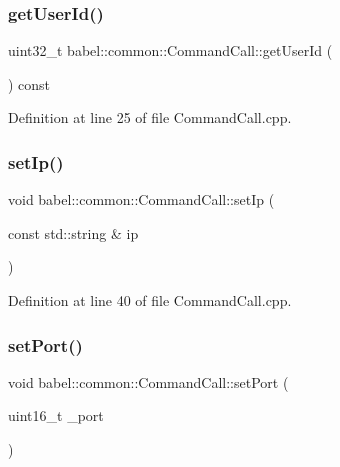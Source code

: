 \subsubsection{\texorpdfstring{get\+User\+Id()}{getUserId()}}
{\footnotesize\ttfamily uint32\+\_\+t babel\+::common\+::\+Command\+Call\+::get\+User\+Id (\begin{DoxyParamCaption}{ }\end{DoxyParamCaption}) const}



Definition at line 25 of file Command\+Call.\+cpp.

\mbox{\label{classbabel_1_1common_1_1_command_call_a58f28b212a295ab0626abc2067f352b9}} 
\subsubsection{\texorpdfstring{set\+Ip()}{setIp()}}
{\footnotesize\ttfamily void babel\+::common\+::\+Command\+Call\+::set\+Ip (\begin{DoxyParamCaption}\item[{const std\+::string \&}]{ip }\end{DoxyParamCaption})}



Definition at line 40 of file Command\+Call.\+cpp.

\mbox{\label{classbabel_1_1common_1_1_command_call_af8d2a768b5464d5da991cab4890b2b67}} 
\subsubsection{\texorpdfstring{set\+Port()}{setPort()}}
{\footnotesize\ttfamily void babel\+::common\+::\+Command\+Call\+::set\+Port (\begin{DoxyParamCaption}\item[{uint16\+\_\+t}]{\+\_\+port }\end{DoxyParamCaption})}



